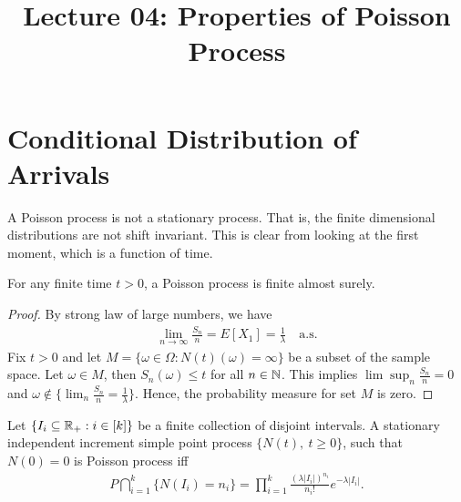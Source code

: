 \documentclass[a4paper,10pt,english]{article}
\title{Lecture 04: Properties of Poisson Process}
\author{}
\begin{document}
\maketitle


\section{Conditional Distribution of Arrivals}
A Poisson process is not a stationary process. That is, the finite dimensional distributions are not shift invariant. 
This is clear from looking at the first moment, which is a function of time. 
\begin{lem} For any finite time $t > 0$, a Poisson process is finite almost surely.
\end{lem}
\begin{proof} By strong law of large numbers, we have 
\begin{align*}
\lim_{n \to \infty} \frac{S_{n}}{n} = E[X_{1}] = \frac{1}{\lambda}\quad\mathrm{a.s.} 
\end{align*}
Fix $t > 0$ and let $M = \{\omega \in \Omega: N(t)(\omega) = \infty \}$ be a subset of the sample space. Let $\omega \in M$, then $S_{n}(\omega)\leqslant t$ for all $n \in \mathbb{N}$. This implies $\lim\sup_n\frac{S_{n}}{n} = 0$  and $\omega \not\in \{\lim_n \frac{S_{n}}{n} = \frac{1}{\lambda} \}.$ Hence, the probability measure for set $M$ is zero. 
\end{proof}

\begin{prop}[Characterization 2] 
Let $\{I_i \subseteq \mathbb{R}_+: i \in [k]\}$ be a finite collection of disjoint intervals. 
A stationary independent increment simple point process $\{N(t),~t\geqslant 0\}$, such that $N(0) = 0$ is Poisson process iff 
\begin{align*}
  P\bigcap_{i=1}^k \{N(I_i)= n_{i}\} = \prod_{i=1}^{k}\frac{(\lambda|I_i|)^{n_{i}}}{n_{i}!} e^{-\lambda |I_i|}.
\end{align*}
\end{prop}
\end{document}
